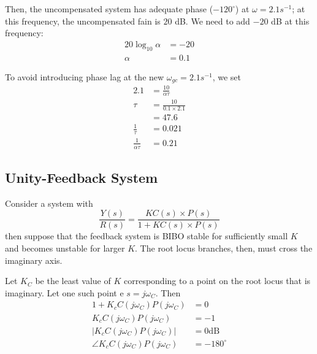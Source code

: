 \documentclass[12pt]{article}
\begin{document}
Then, the uncompensated system has adequate phase ($-120^\circ$) at $\omega = 2.1s^{-1}$; at this frequency, the uncompensated fain is $20$ dB. We need to add $-20$ dB at this frequency:
\begin{align*}
20\log_{10}\alpha &= -20 \\
\alpha &= 0.1
\end{align*}

To avoid introducing phase lag at the new $\omega_{gc} = 2.1s^{-1}$, we set
\begin{align*}
2.1 &= \frac{10}{\alpha\tau} \\
\tau &= \frac{10}{0.1 \times 2.1} \\
&= 47.6 \\
\frac{1}{\tau} &= 0.021 \\
\frac{1}{\alpha\tau} &= 0.21
\end{align*}

\subsection{Unity-Feedback System}
Consider a system with \[ \frac{Y(s)}{R(s)} = \frac{KC(s) \times P(s)}{1 + KC(s) \times P(s)} \] then suppose that the feedback system is BIBO stable for sufficiently small $K$ and becomes unstable for larger $K$. The root locus branches, then, must cross the imaginary axis.

Let $K_C$ be the least value of $K$ corresponding to a point on the root locus that is imaginary. Let one such point e $s = j\omega_C$. Then
\begin{align*}
1 + K_c C(j\omega_C)P(j\omega_C) &= 0 \\
K_c C(j\omega_C)P(j\omega_C) &= -1 \\
\bigl| K_c C(j\omega_C)P(j\omega_C) \bigl| &= 0\text{dB} \\
\angle K_c C(j\omega_C)P(j\omega_C) &= -180^\circ
\end{align*}
\end{document}
